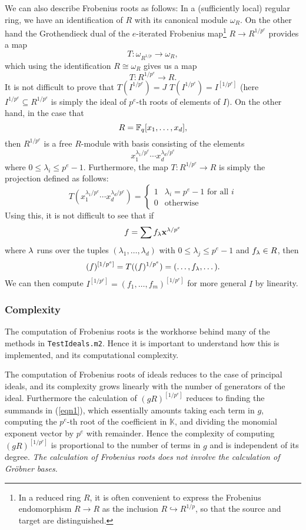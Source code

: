 \documentclass[11pt]{amsart}
\begin{document}
We can also describe Frobenius roots as follows:  In a (sufficiently local) regular ring, we have an identification of $R$ with its canonical module $\omega_R$.  On the other hand the Grothendieck dual of the $e$-iterated Frobenius map\footnote{In a reduced ring $R$, it is often convenient to express the Frobenius endomorphism $R \to R$ as the inclusion $R \hookrightarrow R^{1/p}$, so that the source and target  are distinguished.} $R \to R^{1/p^e}$ provides a map
\begin{equation}
\label{eq.DualToFrobenius}
T : \omega_{R^{1/p}} \to \omega_R,
\end{equation}
which using the identification $R \cong \omega_R$ gives us a map
\[
T : R^{1/p^e} \to R.
\]
It is not difficult to prove that 
\sout{$T(I^{1/p^e}) = J$}
$T(I^{1/p^e})=I^{[1/p^e]}$
(here $I^{1/p^e} \subseteq R^{1/p^e}$ is simply the ideal of $p^e$-th roots of elements of $I$).  On the other hand, in the case that
\[
R = \mathbb{F}_q[x_1, \ldots, x_d],
\]
then $R^{1/p^e}$ is a free $R$-module with basis consisting of the elements
\[
 x_1^{\lambda_1/p^e} \cdots x_d^{\lambda_d/p^e}
\]
where $0 \leq \lambda_i \leq p^e-1$.
Furthermore, the map $T : R^{1/p^e} \to R$ is simply the projection defined as follows:
\[
T(x_1^{\lambda_1/p^e} \cdots x_d^{\lambda_d/p^e}) = \left\{ \begin{array}{rl} 1 & \lambda_i = p^{e}-1 \text{ for all }i \\ 0 & \text{otherwise}  \end{array} \right.
\]
Using this, it is not difficult to see that if
\begin{equation}
\label{eqn1}
f = \sum f_{\bf \lambda} {\bf x}^{{\bf \lambda} / p^e}
\end{equation}
where ${\bf \lambda}$ runs over the tuples $(\lambda_1, \dots, \lambda_d)$ with $0 \leq \lambda_j \leq p^e-1$ and $f_{\bf \lambda} \in R$, then
\[
(f)^{[1/p^e]} = T( (f)^{1/p^e}) = (\dots, f_{\bf \lambda}, \dots).
\]
We can then compute $I^{[1/p^e]} = (f_1, \dots, f_m)^{[1/p^e]}$ for more general $I$ by linearity.

\subsubsection{Complexity}
The computation of Frobenius roots is the workhorse behind many of the methods in {\tt TestIdeals.m2}.
Hence it is important to understand how this is implemented, and its computational complexity.

The computation of Frobenius roots of ideals reduces to the case of principal ideals, and its complexity grows linearly with the number of generators of the ideal.
Furthermore the calculation of  $(gR)^{[1/p^e]}$ reduces to finding the summands in (\ref{eqn1}), which essentially amounts
taking each term in $g$, computing the $p^e$-th root of the coefficient in $\mathbb{K}$, and dividing the monomial exponent vector by $p^e$ with remainder.
Hence the complexity of  computing $(gR)^{[1/p^e]}$ is proportional to the number of terms in $g$ and is independent of its degree.
\emph{The calculation of Frobenius roots does not involve the calculation of Gr\"obner bases.}
\end{document}
